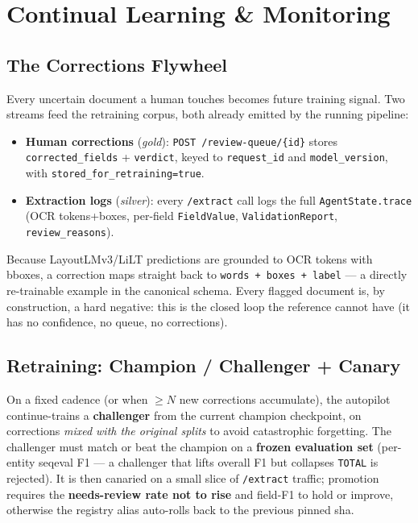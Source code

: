 \documentclass[12pt,a4paper]{article}
\begin{document}
\section{Continual Learning \& Monitoring}

\subsection{The Corrections Flywheel}

Every uncertain document a human touches becomes future training signal. Two streams
feed the retraining corpus, both already emitted by the running pipeline:
\begin{itemize}\setlength\itemsep{0.15em}
  \item \textbf{Human corrections} (\textit{gold}): \texttt{POST /review-queue/\{id\}} stores \texttt{corrected\_fields} + \texttt{verdict}, keyed to \texttt{request\_id} and \texttt{model\_version}, with \texttt{stored\_for\_retraining=true}.
  \item \textbf{Extraction logs} (\textit{silver}): every \texttt{/extract} call logs the full \texttt{AgentState.trace} (OCR tokens+boxes, per-field \texttt{FieldValue}, \texttt{ValidationReport}, \texttt{review\_reasons}).
\end{itemize}
Because LayoutLMv3/LiLT predictions are grounded to OCR tokens with bboxes, a correction
maps straight back to \texttt{words + boxes + label} --- a directly re-trainable example
in the canonical schema. Every flagged document is, by construction, a hard negative:
this is the closed loop the reference cannot have (it has no confidence, no queue, no
corrections).

\subsection{Retraining: Champion / Challenger + Canary}

On a fixed cadence (or when $\geq N$ new corrections accumulate), the autopilot
continue-trains a \textbf{challenger} from the current champion checkpoint, on
corrections \emph{mixed with the original splits} to avoid catastrophic forgetting. The
challenger must match or beat the champion on a \textbf{frozen evaluation set}
(per-entity seqeval F1 --- a challenger that lifts overall F1 but collapses
\texttt{TOTAL} is rejected). It is then canaried on a small slice of \texttt{/extract}
traffic; promotion requires the \textbf{needs-review rate not to rise} and field-F1 to
hold or improve, otherwise the registry alias auto-rolls back to the previous pinned sha.
\end{document}
